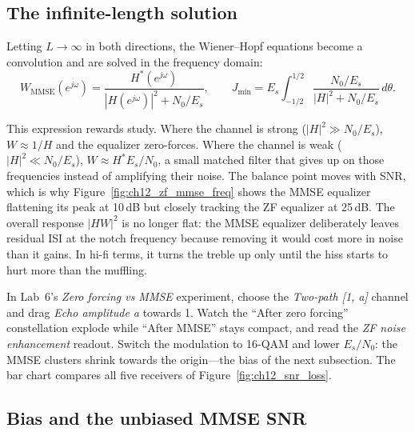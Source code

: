 
\subsection{The infinite-length solution}

Letting $L\to\infty$ in both directions, the Wiener--Hopf equations become a convolution and are
solved in the frequency domain:
\begin{equation}
W_{\mathrm{MMSE}}(e^{j\omega})=\frac{H^*(e^{j\omega})}{|H(e^{j\omega})|^2+N_0/E_s},
\qquad
J_{\min}=E_s\int_{-1/2}^{1/2}\frac{N_0/E_s}{|H|^2+N_0/E_s}\,d\theta .
\label{eq:ch12:mmseinf}
\end{equation}

This expression rewards study. Where the channel is strong ($|H|^2\gg N_0/E_s$),
$W\approx1/H$ and the equalizer zero-forces. Where the channel is weak ($|H|^2\ll N_0/E_s$),
$W\approx H^*E_s/N_0$, a small matched filter that gives up on those frequencies instead of
amplifying their noise. The balance point moves with SNR, which is why
Figure~\ref{fig:ch12_zf_mmse_freq} shows the MMSE equalizer flattening its peak at 10\,dB but
closely tracking the ZF equalizer at 25\,dB. The overall response $|HW|^2$ is no longer flat: the
MMSE equalizer deliberately leaves residual ISI at the notch frequency because removing it would
cost more in noise than it gains. In hi-fi terms, it turns the treble up only until the hiss starts
to hurt more than the muffling.

\begin{tryit}
In Lab~6's \emph{Zero forcing vs MMSE} experiment, choose the \emph{Two-path [1, a]} channel and
drag \emph{Echo amplitude a} towards 1. Watch the ``After zero forcing'' constellation explode while
``After MMSE'' stays compact, and read the \emph{ZF noise enhancement} readout. Switch the modulation
to 16-QAM and lower $E_s/N_0$: the MMSE clusters shrink towards the origin---the bias of the next
subsection. The bar chart compares all five receivers of Figure~\ref{fig:ch12_snr_loss}.
\end{tryit}

\subsection{Bias and the unbiased MMSE SNR}
\label{sec:ch12:bias}

